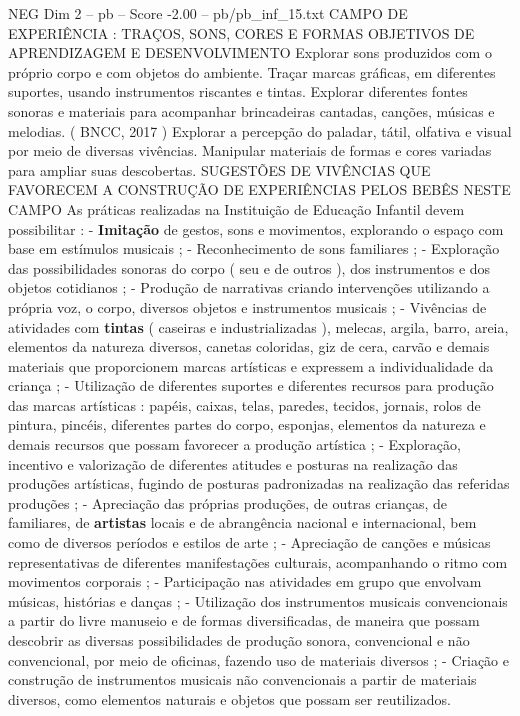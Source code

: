 \begin{textsample}{NEG Dim 2 – pb – Score -2.00 – pb/pb\_inf\_15.txt}  \label{ex:f2_neg_007}
CAMPO DE EXPERIÊNCIA : TRAÇOS, SONS, CORES E FORMAS OBJETIVOS DE APRENDIZAGEM E DESENVOLVIMENTO Explorar sons produzidos com o próprio corpo e com objetos do ambiente.
Traçar marcas gráficas, em diferentes suportes, usando instrumentos riscantes e tintas.
Explorar diferentes fontes sonoras e materiais para acompanhar brincadeiras cantadas, canções, músicas e melodias. ( BNCC, 2017 ) Explorar a percepção do paladar, tátil, olfativa e visual por meio de diversas vivências.
Manipular materiais de formas e cores variadas para ampliar suas descobertas.
SUGESTÕES DE VIVÊNCIAS QUE FAVORECEM A CONSTRUÇÃO DE EXPERIÊNCIAS PELOS BEBÊS NESTE CAMPO As práticas realizadas na Instituição de Educação Infantil devem possibilitar : - \textbf{Imitação} de gestos, sons e movimentos, explorando o espaço com base em estímulos musicais ; - Reconhecimento de sons familiares ; - Exploração das possibilidades sonoras do corpo ( seu e de outros ), dos instrumentos e dos objetos cotidianos ; - Produção de narrativas criando intervenções utilizando a própria voz, o corpo, diversos objetos e instrumentos musicais ; - Vivências de atividades com \textbf{tintas} ( caseiras e industrializadas ), melecas, argila, barro, areia, elementos da natureza diversos, canetas coloridas, giz de cera, carvão e demais materiais que proporcionem marcas artísticas e expressem a individualidade da criança ; - Utilização de diferentes suportes e diferentes recursos para produção das marcas artísticas : papéis, caixas, telas, paredes, tecidos, jornais, rolos de pintura, pincéis, diferentes partes do corpo, esponjas, elementos da natureza e demais recursos que possam favorecer a produção artística ; - Exploração, incentivo e valorização de diferentes atitudes e posturas na realização das produções artísticas, fugindo de posturas padronizadas na realização das referidas produções ; - Apreciação das próprias produções, de outras crianças, de familiares, de \textbf{artistas} locais e de abrangência nacional e internacional, bem como de diversos períodos e estilos de arte ; - Apreciação de canções e músicas representativas de diferentes manifestações culturais, acompanhando o ritmo com movimentos corporais ; - Participação nas atividades em grupo que envolvam músicas, histórias e danças ; - Utilização dos instrumentos musicais convencionais a partir do livre manuseio e de formas diversificadas, de maneira que possam descobrir as diversas possibilidades de produção sonora, convencional e não convencional, por meio de oficinas, fazendo uso de materiais diversos ; - Criação e construção de instrumentos musicais não convencionais a partir de materiais diversos, como elementos naturais e objetos que possam ser reutilizados.

\end{textsample}
